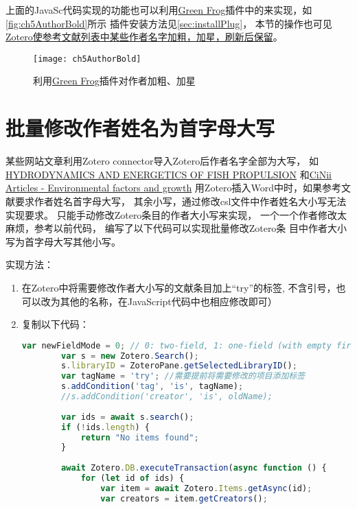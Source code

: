 \documentclass[theorem=false,mathfont=none,openany,sub3section]{easybook}
\begin{document}
{上面的JavaSc代码实现的功能也可以利用\href{https://github.com/redleafnew/zotero-updateifsE}{Green Frog}插件中的来实现，如\autoref{fig:ch5AuthorBold}所示
插件安装方法见\cref{sec:installPlug}，
本节的操作也可见
\href{https://zhuanlan.zhihu.com/p/353770101}
{Zotero使参考文献列表中某些作者名字加粗，加星，刷新后保留}。

\begin{figure}[htbp]
	\centering
	\texttt{[image: ch5AuthorBold]}
	\caption{利用\href{https://github.com/redleafnew/zotero-updateifsE}{Green Frog}插件对作者加粗、加星}
	\label{fig:ch5AuthorBold}
\end{figure}

\section{批量修改作者姓名为首字母大写}\label{sec:authorUpper}
某些网站文章利用Zotero connector导入Zotero后作者名字全部为大写，
如\href{https://pascal-francis.inist.fr/vibad/index.php?action=getRecordDetail&idt=PASCAL7536509928}
{HYDRODYNAMICS AND ENERGETICS OF FISH PROPULSION}
和\href{https://ci.nii.ac.jp/naid/10008557972/}
{CiNii Articles - Environmental factors and growth}
用Zotero插入Word中时，如果参考文献要求作者姓名首字母大写，
其余小写，通过修改csl文件中作者姓名大小写无法实现要求。
只能手动修改Zotero条目的作者大小写来实现，
一个一个作者修改太麻烦，参考以前代码，
编写了以下代码可以实现批量修改Zotero条
目中作者大小写为首字母大写其他小写。

实现方法：
\begin{enumerate}
	\item 在Zotero中将需要修改作者大小写的文献条目加上“try”的标签,
	不含引号，也可以改为其他的名称，在JavaScript代码中也相应修改即可）
	\item 复制以下代码：
	\begin{lstlisting}[language=JavaScript]
		var newFieldMode = 0; // 0: two-field, 1: one-field (with empty first name)
		var s = new Zotero.Search();
		s.libraryID = ZoteroPane.getSelectedLibraryID();
		var tagName = 'try'; //需要提前将需要修改的项目添加标签
		s.addCondition('tag', 'is', tagName);
		//s.addCondition('creator', 'is', oldName);
		
		var ids = await s.search();
		if (!ids.length) {
			return "No items found";
		}
		
		await Zotero.DB.executeTransaction(async function () {
			for (let id of ids) {
				var item = await Zotero.Items.getAsync(id);
				var creators = item.getCreators();
				

\end{lstlisting}
\end{enumerate}}
\end{document}

